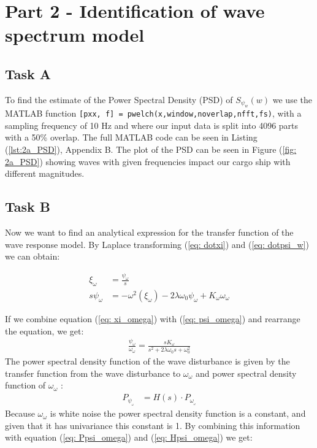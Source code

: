 \section{Part 2 - Identification of wave spectrum model}
\subsection{Task A}

To find the estimate of the Power Spectral Density (PSD) of $S_{\psi_w}(w)$ we use the MATLAB function \texttt{[pxx, f] = pwelch(x,window,noverlap,nfft,fs)}, with a sampling frequency of 10 Hz and where our input data is split into 4096 parts with a 50\% overlap. 
The full MATLAB code can be seen in Listing (\ref{lst:2a_PSD}), Appendix B. The plot of the PSD can be seen in Figure (\ref{fig: 2a_PSD}) showing waves with given frequencies impact our cargo ship with different magnitudes. 


\subsection{Task B}
Now we want to find an analytical expression for the transfer function of the wave response model. By Laplace transforming (\ref{eq: dotxi}) and (\ref{eq: dotpsi_w}) we can obtain:
\begin{equations}
    \begin{align}
        \xi_\omega &= \frac{\psi_\omega}{s} \label{eq: xi_omega}\\
        s\psi_\omega &= -\omega^2(\xi_\omega) -2\lambda\omega_0\psi_\omega + K_\omega\omega_\omega \label{eq: psi_omega}
    \end{align}
\end{equations}
\newline
If we combine equation (\ref{eq: xi_omega}) with (\ref{eq: psi_omega}) and rearrange the equation, we get:
\begin{equation}
    \begin{align}
        \frac{\psi_\omega}{\omega_\omega} = \frac{sK_\omega}{s^2 + 2\lambda\omega_0s + \omega_0^2}
        \label{eq: Hpsi_omega}
    \end{align}
\end{equation}
\newline
The power spectral density function of the wave disturbance is given by the transfer function from the wave disturbance to 
$\omega_\omega$
and power spectral density function of $\omega_\omega$
:
\begin{equation}
    \begin{align}
        P_\psi__\omega &= H(s)\cdot P_\omega__\omega
        \label{eq: Ppsi_omega}
    \end{align}
\end{equation}
\newline
Because $\omega_\omega$
is white noise the power spectral density function is a constant, and given that it has univariance this constant is 1. 
By combining this information with equation (\ref{eq: Ppsi_omega}) and (\ref{eq: Hpsi_omega}) we get:

